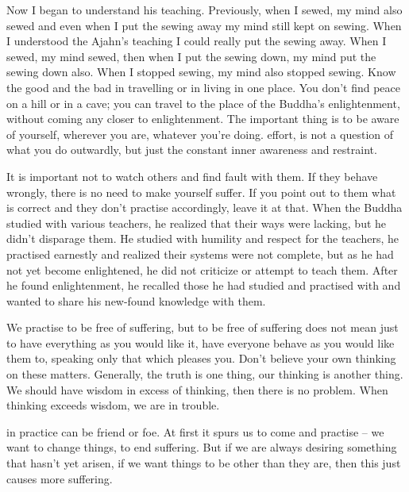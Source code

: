 Now I began to understand his teaching. Previously, when I sewed, my mind also sewed and even when I put the sewing away my mind still kept on sewing. When I understood the Ajahn's teaching I could really put the sewing away. When I sewed, my mind sewed, then when I put the sewing down, my mind put the sewing down also. When I stopped sewing, my mind also stopped sewing.  Know the good and the bad in travelling or in living in one place. You don't find peace on a hill or in a cave; you can travel to the place of the Buddha's enlightenment, without coming any closer to enlightenment. The important thing is to be aware of yourself, wherever you are, whatever you're doing.  effort, is not a question of what you do outwardly, but just the constant inner awareness and restraint.

It is important not to watch others and find fault with them. If they behave wrongly, there is no need to make yourself suffer. If you point out to them what is correct and they don't practise accordingly, leave it at that. When the Buddha studied with various teachers, he realized that their ways were lacking, but he didn't disparage them. He studied with humility and respect for the teachers, he practised earnestly and realized their systems were not complete, but as he had not yet become enlightened, he did not criticize or attempt to teach them. After he found enlightenment, he recalled those he had studied and practised with and wanted to share his new-found knowledge with them.

We practise to be free of suffering, but to be free of suffering does not mean just to have everything as you would like it, have everyone behave as you would like them to, speaking only that which pleases you. Don't believe your own thinking on these matters. Generally, the truth is one thing, our thinking is another thing. We should have wisdom in excess of thinking, then there is no problem. When thinking exceeds wisdom, we are in trouble.

 in practice can be friend or foe. At first it spurs us to come and practise -- we want to change things, to end suffering. But if we are always desiring something that hasn't yet arisen, if we want things to be other than they are, then this just causes more suffering.

